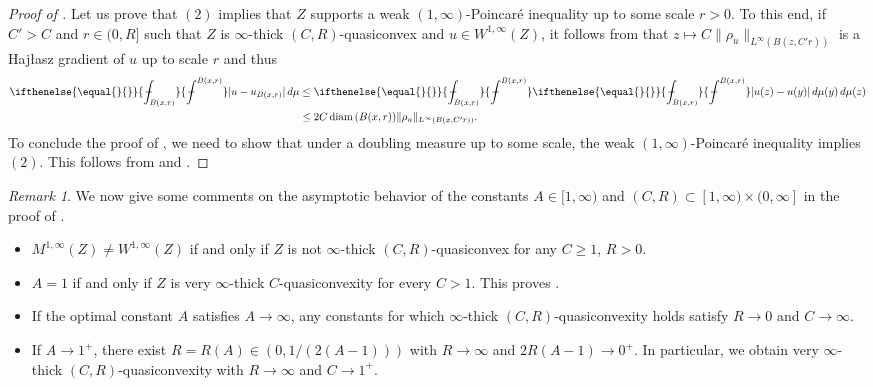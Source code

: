 \documentclass[reqno]{amsart}
\newcommand{\aint}[2][]{%
	\ifthenelse{\equal{#1}{}}%
					{%
\mathchoice%
      {\mathop{\kern 0.2em\vrule width 0.6em height 0.69678ex depth -0.58065ex
              \kern -0.8em \intop}\nolimits_{\kern -0.45em#2}^{#1}}%
      {\mathop{\kern 0.1em\vrule width 0.5em height 0.69678ex depth -0.60387ex
              \kern -0.6em \intop}\nolimits_{#2}^{#1}}%
      {\mathop{\kern 0.1em\vrule width 0.5em height 0.69678ex depth -0.60387ex
              \kern -0.6em \intop}\nolimits_{#2}^{#1}}%
      {\mathop{\kern 0.1em\vrule width 0.5em height 0.69678ex depth -0.60387ex
              \kern -0.6em \intop}\nolimits_{#2}^{#1}}}%
					{%
\mathchoice%
      {\mathop{\kern 0.2em\vrule width 0.6em height 0.69678ex depth -0.58065ex
              \kern -0.8em \intop}\nolimits_{\kern -0.45em#1}^{#2}}%
      {\mathop{\kern 0.1em\vrule width 0.5em height 0.69678ex depth -0.60387ex
              \kern -0.6em \intop}\nolimits_{#1}^{#2}}%
      {\mathop{\kern 0.1em\vrule width 0.5em height 0.69678ex depth -0.60387ex
              \kern -0.6em \intop}\nolimits_{#1}^{#2}}%
      {\mathop{\kern 0.1em\vrule width 0.5em height 0.69678ex depth -0.60387ex
              \kern -0.6em \intop}\nolimits_{#1}^{#2}}}}
\numberwithin{equation}{section}
\theoremstyle{remark}
\newtheorem{remark}[theorem]{Remark}
\DeclareMathOperator{\diam}{diam}
\def\diam{{\mathop\mathrm{\,diam\,}}}
\begin{document}
\begin{proof}[Proof of ]
Let us prove that $(2)$ implies that $Z$ supports a weak $(1,\infty)$-Poincaré inequality up to some scale $r>0$. To this end, if $C' > C$ and $r \in (0,R]$ such that $Z$ is $\infty$-thick $(C,R)$-quasiconvex and $u \in W^{1,\infty}(Z)$, it follows from  that $z \mapsto C \| \rho_u \|_{ L^{\infty}( B(z,C'r) ) }$ is a Haj\l{}asz gradient of $u$ up to scale $r$ and thus
\begin{align*}
    \aint{ B(x,r) } | u - u_{ B(x,r) } |\,d\mu
    &\leq
    \aint{ B(x,r) } \aint{ B(x,r) } | u(z)-u(y) |\,d\mu(y)\,d\mu(z)
    \\
    &\leq
    2C \diam( B(x,r) )\| \rho_u \|_{ L^{\infty}(B(x,C'r)) }.
\end{align*}
To conclude the proof of , we need to show that under a doubling measure up to some scale, the weak $(1,\infty)$-Poincaré inequality implies $(2)$. This follows from  and  .
\end{proof}

\begin{remark}\label{rem:asymptoticbehaviour}
We now give some comments on the asymptotic behavior of the constants $A\in [1,\infty)$ and $(C,R)\subset [1,\infty)\times (0,\infty]$ in the proof of . 
  \begin{itemize}
      \item $M^{1,\infty}(Z) \neq W^{1,\infty}(Z)$ if and only if $Z$ is not $\infty$-thick $(C,R)$-quasiconvex for any $C \geq 1$, $R > 0$.
      \item $A = 1$ if and only if $Z$ is very $\infty$-thick $C$-quasiconvexity for every $C>1$. This proves .
      \item If the optimal constant $A$ satisfies $A\to\infty$, any constants for which $\infty$-thick $(C,R)$-quasiconvexity holds satisfy $R\to 0$ and $C\to \infty$.
      \item If $A\to 1^+$, there exist $R=R(A)\in (0, 1/(2(A-1)))$ with $R\to\infty$ and $2R(A-1)\to 0^+$. In particular, we obtain very $\infty$-thick $(C,R)$-quasiconvexity with $R\to \infty$ and $C\to 1^+$.
  \end{itemize}
\end{remark}
\end{document}

